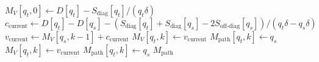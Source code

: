\documentclass[12pt]{article}
\DeclarePairedDelimiter\floor{\lfloor}{\rfloor}
\begin{document}
\begin{algorithm}
\begin{algorithmic}
        \STATE
        \STATE {}
        \STATE $M_{V}[q_t, 0] \gets D[q_t] - S_{\text{diag}}[q_t]/(q_t\delta)$ 
        \STATE $c_{\text{current}} \gets D[q_t]-D[q_s] - (S_{\text{diag}}[q_t]+S_{\text{diag}}[q_s]-2S_{\text{off-diag}}[q_s])/(q_t\delta-q_s\delta)$ 
        \STATE $v_{\text{current}} \gets M_V[q_s, k-1] + c_{\text{current}}$ 
        \STATE $M_V[q_t, k] \gets v_{\text{current}}$
        \STATE $M_{\text{path}}[q_t, k] \gets q_s$
        \ELSE
        \STATE $M_V[q_t, k] \gets v_{\text{current}}$
        \STATE $M_{\text{path}}[q_t, k] \gets q_s$
        \ENDIF
        \ENDIF
        \ENDFOR
        \ENDFOR
        \ENDFOR
        \RETURN $M_{\text{path}}$
    \end{algorithmic}
\end{algorithm}




\end{document}
